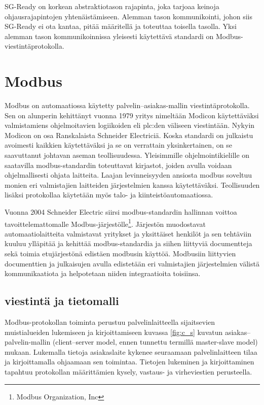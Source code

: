   SG-Ready on korkean abstraktiotason rajapinta, joka tarjoaa keinoja ohjausrajapintojen yhtenäistämiseen. Alemman tason kommunikointi, johon siis SG-Ready ei ota kantaa, pitää määritellä ja toteuttaa toisella tasolla. Yksi alemman tason kommunikoinnissa yleisesti käytettävä standardi on Modbus-viestintäprotokolla.

\section{Modbus}

  Modbus on automaatiossa käytetty palvelin--asiakas-mallin viestintäprotokolla. Sen on alunperin kehittänyt vuonna 1979 yritys nimeltään Modicon käytettäväksi valmistamiens ohjelmoitavien logiikoiden eli \Gls{plc}:den väliseen viestintään. Nykyin Modicon on osa Ranskalaista Schneider Electriciä. Koska standardi on julkaistu avoimesti kaikkien käytettäväksi ja se on verrattain yksinkertainen, on se saavuttanut johtavan aseman teollisuudessa. Yleisimmille ohjelmointikielille on saatavilla modbus-standardin toteuttavat kirjastot, joiden avulla voidaan ohjelmallisesti  ohjata laitteita. Laajan levinneisyyden ansiosta modbus soveltuu monien eri valmistajien laitteiden järjestelmien kanssa käytettäväksi. Teollisuuden lisäksi protokollaa käytetään myös talo- ja kiinteistöautomaatiossa.\parencite{sousaPortugal, modbusAppSpec, modbusOrg}

  Vuonna 2004 Schneider Electric siirsi modbus-standardin hallinnan voittoa tavoittelemattomalle Modbus-järjestölle\footnote{Modbus Organization, Inc}. Järjestön muodostavat automaatiolaitteita valmistavat yritykset ja yksittäiset henkilöt ja sen tehtäviin kuuluu ylläpitää ja kehittää modbus-standardia ja siihen liittyviä documentteja sekä toimia etujärjestönä edistäen modbusin käyttöä. Modbusiin liittyvien documenttien ja julkaisujen avulla edistetään eri valmistajien järjestelmien välistä kommunikaatiota ja helpotetaan niiden integraatioita toisiinsa.  \parencite{modbusOrg}

  \subsection{viestintä ja tietomalli}

  Modbus-protokollan toiminta perustuu palvelinlaitteella sijaitsevien muistialueiden lukemiseen ja kirjoittamiseen kuvassa \ref{fig:c_s} kuvatun asiakas--palvelin-mallin (client--server model, ennen tunnettu termillä master-slave model) mukaan.  Lukemalla tietoja asiakaslaite kykenee seuraamaan palvelinlaitteen tilaa ja kirjoittamalla ohjaamaan sen toimintaa. Tietojen lukeminen ja kirjoittaminen tapahtuu protokollan määrittämien kysely, vastaus- ja virheviestien perusteella.\parencite{modbusAppSpec}

